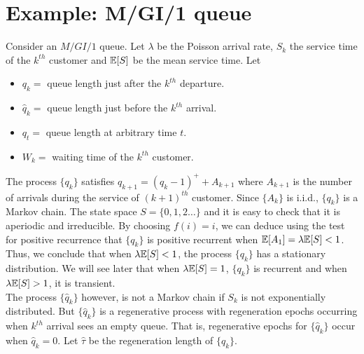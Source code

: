 \documentclass[all-lectures.tex]{subfiles}
\begin{document}

\setcounter{section}{5}
\setcounter{subsection}{0}

\section*{}
\chr
\section{Example: M/GI/1 queue}
Consider an $M/GI/1$ queue. Let $\lambda$  be the Poisson arrival rate, $S_k$ the service time of the $k^{th}$ customer and $\mathbb{E}[S]$ be the mean service time. Let 
\begin{itemize}
\item $q_k = $ queue length just after the $k^{th}$ departure. 
\item $\hat{q}_k = $ queue length just before the $k^{th}$ arrival. 
\item $q_t =$ queue length at arbitrary time $t$.
\item $W_k = $ waiting time of the $k^{th}$ customer.
\end{itemize}
The process $\{q_k\}$ satisfies $q_{k+1} = (q_k -1)^+ + A_{k+1}$ where $A_{k+1}$ is the number of arrivals during the service of $(k+1)^{th}$ customer. Since $\{A_k\}$ is i.i.d., $\{q_k\}$ is a Markov chain. The state space $S = \{0,1,2\dots\}$ and it is easy to check that it is aperiodic and irreducible. By choosing $f(i) = i$, we can deduce using the test for positive recurrence that $\{q_k\}$ is positive recurrent when $\mathbb{E}[A_1] = \lambda \mathbb{E}[S] < 1$. Thus, we conclude that when $\lambda \mathbb{E}[S] < 1$, the process $\{q_k\}$ has a stationary distribution. We will  see later that when $\lambda\mathbb{E}[S] = 1$, $\{q_k\}$ is recurrent and when $\lambda \mathbb{E}[S] > 1$, it is transient. \\
\indent  The process $\{\hat{q}_k\}$ however, is not a Markov chain if $S_k$ is not exponentially distributed. But $\{\hat{q}_k\}$ is a regenerative process with regeneration epochs occurring when $k^{th}$ arrival sees an empty queue. That is, regenerative epochs for $\{\hat{q}_k\}$ occur when $ \hat{q}_k = 0$. Let $\hat{\tau}$ be the regeneration length of $\{\hat{q}_k\}$. \\
\end{document}
